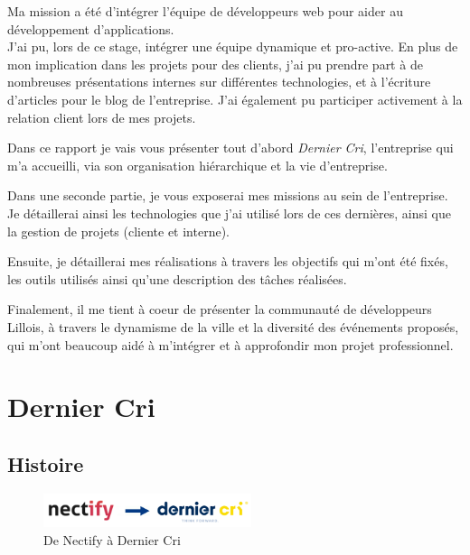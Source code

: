 \documentclass[12pt,a4paper]{article}
\begin{document}
  \bigskip

  Ma mission a été d'intégrer l'équipe de développeurs web pour aider au
  développement d'applications.\\
  J'ai pu, lors de ce stage, intégrer une équipe dynamique et pro-active.
  En plus de mon implication dans les projets pour des clients, j'ai pu
  prendre part à de nombreuses présentations internes sur différentes
  technologies, et à l'écriture d'articles pour le blog de l'entreprise.
  J'ai également pu participer activement à la relation client lors de mes
  projets.

  \bigskip

  Dans ce rapport je vais vous présenter tout d'abord \emph{Dernier Cri},
  l'entreprise qui m'a accueilli, via son organisation hiérarchique et la
  vie d'entreprise.

  \bigskip

  Dans une seconde partie, je vous exposerai mes missions au sein de
  l'entreprise. Je détaillerai ainsi les technologies que j'ai utilisé
  lors de ces dernières, ainsi que la gestion de projets (cliente et
  interne).

  \bigskip

  Ensuite, je détaillerai mes réalisations à travers les objectifs qui
  m'ont été fixés, les outils utilisés ainsi qu'une description des tâches
  réalisées.

  \bigskip

  Finalement, il me tient à coeur de présenter la communauté de
  développeurs Lillois, à travers le dynamisme de la ville et la diversité
  des événements proposés, qui m'ont beaucoup aidé à m'intégrer et à
  approfondir mon projet professionnel.

  \newpage

  \section{Dernier Cri}\label{dernier-cri}

  \bigskip

  \subsection{Histoire}\label{histoire}

  \begin{figure}[h]
    \centering
    \includegraphics[height=1cm]{figures/NectifyToDC.png}
    \caption{De Nectify à Dernier Cri}
  \end{figure}
\end{document}
